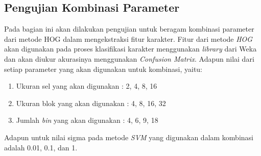 \subsection{Pengujian Kombinasi Parameter}
\noindent Pada bagian ini akan dilakukan pengujian untuk beragam kombinasi parameter dari metode HOG dalam mengekstraksi fitur karakter. Fitur dari metode \textit{HOG} akan digunakan pada proses klasifikasi karakter menggunakan \textit{library} dari Weka dan akan diukur akurasinya menggunakan \textit{Confusion Matrix}. Adapun nilai dari setiap parameter yang akan digunakan untuk kombinasi, yaitu:
\begin{enumerate}
\item Ukuran sel yang akan digunakan : 2, 4, 8, 16
\item Ukuran blok yang akan digunakan : 4, 8, 16, 32
\item Jumlah \textit{bin} yang akan digunakan : 4, 6, 9, 18
\end{enumerate}
\noindent Adapun untuk nilai sigma pada metode \textit{SVM} yang digunakan dalam kombinasi adalah 0.01, 0.1, dan 1.\\
